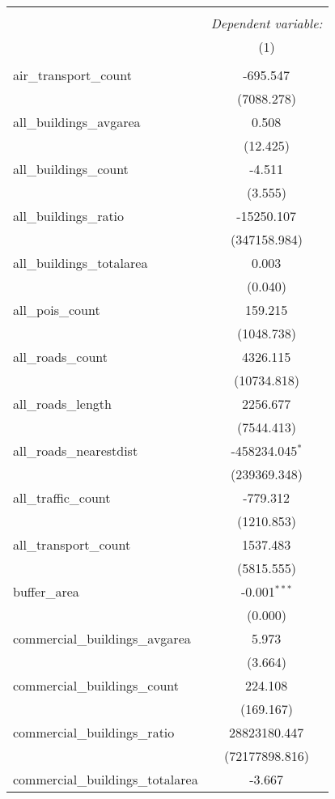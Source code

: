 \begin{table}[!htbp] \centering
\begin{tabular}{@{\extracolsep{5pt}}lc}
\\[-1.8ex]\hline
\hline \\[-1.8ex]
& \multicolumn{1}{c}{\textit{Dependent variable:}} \
\cr \cline{1-2}
\\[-1.8ex] & (1) \\
\hline \\[-1.8ex]
 air_transport_count & -695.547$^{}$ \\
  & (7088.278) \\
 all_buildings_avgarea & 0.508$^{}$ \\
  & (12.425) \\
 all_buildings_count & -4.511$^{}$ \\
  & (3.555) \\
 all_buildings_ratio & -15250.107$^{}$ \\
  & (347158.984) \\
 all_buildings_totalarea & 0.003$^{}$ \\
  & (0.040) \\
 all_pois_count & 159.215$^{}$ \\
  & (1048.738) \\
 all_roads_count & 4326.115$^{}$ \\
  & (10734.818) \\
 all_roads_length & 2256.677$^{}$ \\
  & (7544.413) \\
 all_roads_nearestdist & -458234.045$^{*}$ \\
  & (239369.348) \\
 all_traffic_count & -779.312$^{}$ \\
  & (1210.853) \\
 all_transport_count & 1537.483$^{}$ \\
  & (5815.555) \\
 buffer_area & -0.001$^{***}$ \\
  & (0.000) \\
 commercial_buildings_avgarea & 5.973$^{}$ \\
  & (3.664) \\
 commercial_buildings_count & 224.108$^{}$ \\
  & (169.167) \\
 commercial_buildings_ratio & 28823180.447$^{}$ \\
  & (72177898.816) \\
 commercial_buildings_totalarea & -3.667$^{}$ \\

\end{tabular}
\end{table}
